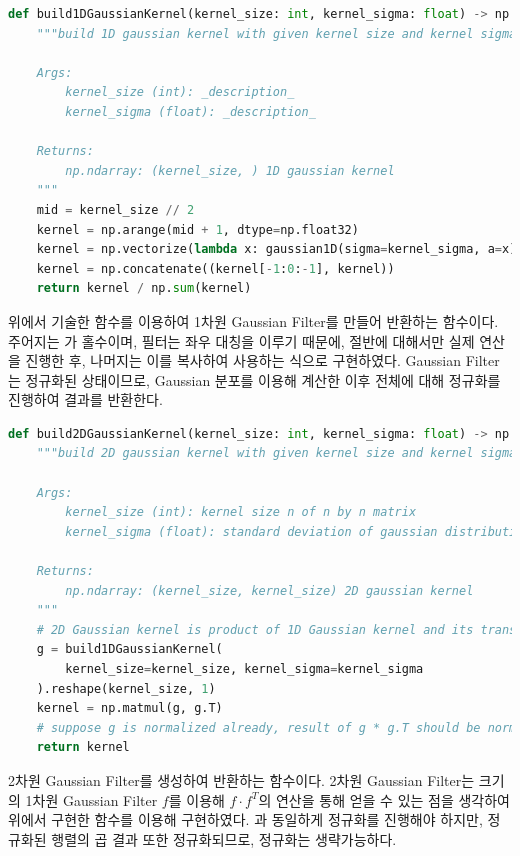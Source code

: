 \documentclass{report}
\begin{document}
\begin{lstlisting}[language=Python, caption=Primitive - build1DGaussianKernel, firstnumber=90]
def build1DGaussianKernel(kernel_size: int, kernel_sigma: float) -> np.ndarray:
    """build 1D gaussian kernel with given kernel size and kernel sigman for gaussian distribution

    Args:
        kernel_size (int): _description_
        kernel_sigma (float): _description_

    Returns:
        np.ndarray: (kernel_size, ) 1D gaussian kernel
    """
    mid = kernel_size // 2
    kernel = np.arange(mid + 1, dtype=np.float32)
    kernel = np.vectorize(lambda x: gaussian1D(sigma=kernel_sigma, a=x))(kernel)
    kernel = np.concatenate((kernel[-1:0:-1], kernel))
    return kernel / np.sum(kernel)
\end{lstlisting}

위에서 기술한  함수를 이용하여 1차원 Gaussian Filter를 만들어 반환하는 함수이다.
주어지는 가 홀수이며, 필터는 좌우 대칭을 이루기 때문에, 절반에 대해서만 실제 연산을 진행한 후, 나머지는 이를 복사하여 사용하는 식으로 구현하였다.
Gaussian Filter는 정규화된 상태이므로, Gaussian 분포를 이용해 계산한 이후 전체에 대해 정규화를 진행하여 결과를 반환한다.

\begin{lstlisting}[language=Python, caption=Primitive - build2DGaussianKernel, firstnumber=107]
def build2DGaussianKernel(kernel_size: int, kernel_sigma: float) -> np.ndarray:
    """build 2D gaussian kernel with given kernel size and kernel sigman for gaussian distribution

    Args:
        kernel_size (int): kernel size n of n by n matrix
        kernel_sigma (float): standard deviation of gaussian distribution

    Returns:
        np.ndarray: (kernel_size, kernel_size) 2D gaussian kernel
    """
    # 2D Gaussian kernel is product of 1D Gaussian kernel and its transpose
    g = build1DGaussianKernel(
        kernel_size=kernel_size, kernel_sigma=kernel_sigma
    ).reshape(kernel_size, 1)
    kernel = np.matmul(g, g.T)
    # suppose g is normalized already, result of g * g.T should be normalized, too
    return kernel 
\end{lstlisting}

2차원 Gaussian Filter를 생성하여 반환하는 함수이다.
2차원 Gaussian Filter는  크기의 1차원 Gaussian Filter $f$를 이용해 $f \cdot f^T$의 연산을 통해 얻을 수 있는 점을 생각하여 위에서 구현한  함수를 이용해 구현하였다.
과 동일하게 정규화를 진행해야 하지만, 정규화된 행렬의 곱 결과 또한 정규화되므로, 정규화는 생략가능하다.
\end{document}
